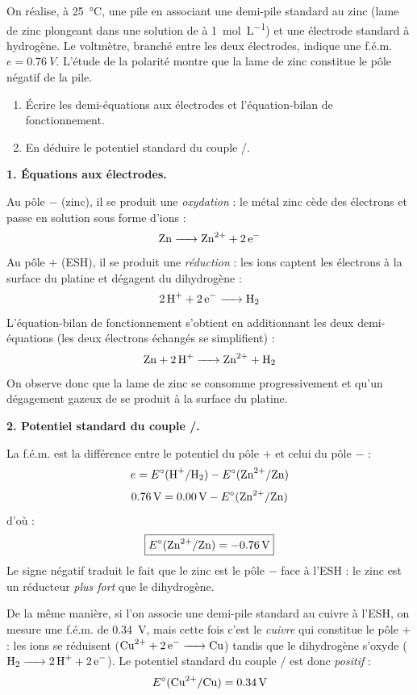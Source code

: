 \documentclass[11pt]{article}
\begin{document}
\begin{exoresolu}
On réalise, à \SI{25}{\celsius}, une pile en associant une demi-pile standard au zinc (lame de zinc plongeant dans une solution de  à \SI{1}{mol.L^{-1}}) et une électrode standard à hydrogène. Le voltmètre, branché entre les deux électrodes, indique une f.é.m. $e = \SI{0,76}{V}$. L'étude de la polarité montre que la lame de zinc constitue le pôle négatif de la pile.
\begin{enumerate}
\item Écrire les demi-équations aux électrodes et l'équation-bilan de fonctionnement.
\item En déduire le potentiel standard du couple /.
\end{enumerate}
\tcblower
\textbf{1. Équations aux électrodes.}

Au pôle $-$ (zinc), il se produit une \emph{oxydation} : le métal zinc cède des électrons et passe en solution sous forme d'ions  :
\[ \ce{Zn -> Zn^2+ + 2e-} \]
Au pôle $+$ (ESH), il se produit une \emph{réduction} : les ions  captent les électrons à la surface du platine et dégagent du dihydrogène :
\[ \ce{2H+ + 2e- -> H2} \]
L'équation-bilan de fonctionnement s'obtient en additionnant les deux demi-équations (les deux électrons échangés se simplifient) :
\[ \ce{Zn + 2H+ -> Zn^2+ + H2} \]
On observe donc que la lame de zinc se consomme progressivement et qu'un dégagement gazeux de  se produit à la surface du platine.

\textbf{2. Potentiel standard du couple /.}

La f.é.m. est la différence entre le potentiel du pôle $+$ et celui du pôle $-$ :
\[ e = E^\circ(\ce{H+}/\ce{H2}) - E^\circ(\ce{Zn^2+}/\ce{Zn}) \]
\[ \SI{0,76}{V} = \SI{0,00}{V} - E^\circ(\ce{Zn^2+}/\ce{Zn}) \]
d'où :
\[ \boxed{E^\circ(\ce{Zn^2+}/\ce{Zn}) = \SI{-0,76}{V}} \]
Le signe négatif traduit le fait que le zinc est le pôle $-$ face à l'ESH : le zinc est un réducteur \emph{plus fort} que le dihydrogène.
\end{exoresolu}

De la même manière, si l'on associe une demi-pile standard au cuivre à l'ESH, on mesure une f.é.m. de \SI{0,34}{V}, mais cette fois c'est le \emph{cuivre} qui constitue le pôle $+$ : les ions  se réduisent ($\ce{Cu^2+ + 2e- -> Cu}$) tandis que le dihydrogène s'oxyde ($\ce{H2 -> 2H+ + 2e-}$). Le potentiel standard du couple / est donc \emph{positif} :
\[ E^\circ(\ce{Cu^2+}/\ce{Cu}) = \SI{+0,34}{V} \]
\end{document}
